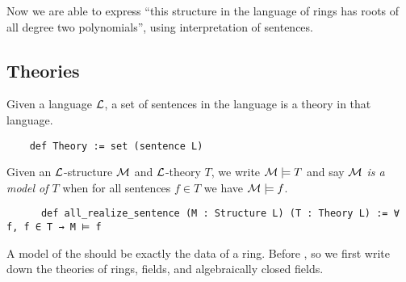 Now we are able to express ``this structure in the language of rings has roots
of all degree two polynomials'', using interpretation of sentences.

\subsection{Theories}


\begin{dfn}[Theory]
  Given a language $\mathcal{L}$,
  a set of sentences in the language is a theory in that language.
  \begin{lstlisting}
    def Theory := set (sentence L)   \end{lstlisting}
\end{dfn}


\begin{dfn}[Models]
    Given an $\mathcal{L}$-structure $\mathcal{M}$ and $\mathcal{L}$-theory $T$,
    we write $\mathcal{M} \models T$ and say
    \emph{$\mathcal{M}$ is a model of $T$} when
    for all sentences $f \in T$ we have $\mathcal{M} \models f$.

    \begin{lstlisting}
      def all_realize_sentence (M : Structure L) (T : Theory L) := ∀ f, f ∈ T → M ⊨ f \end{lstlisting}
  \end{dfn}

A model of the  should be exactly the data of a ring.
Before , so we first write down the theories of
rings, fields, and algebraically closed fields.

